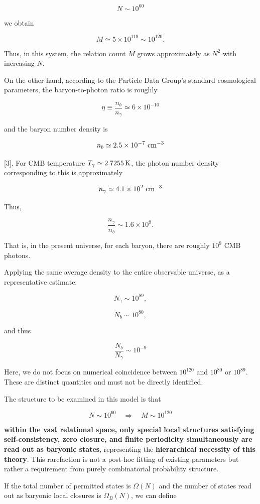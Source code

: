 \documentclass[
  a4paper,
]{article}
\begin{document}
\[
N\sim10^{60}
\]

we obtain

\[
M
\simeq
5\times10^{119}
\sim10^{120}.
\tag{20}
\]

Thus, in this system, the relation count \(M\) grows approximately as
\(N^2\) with increasing \(N\).

On the other hand, according to the Particle Data Group's standard
cosmological parameters, the baryon-to-photon ratio is roughly

\[
\eta
\equiv
\frac{n_b}{n_\gamma}
\simeq
6\times10^{-10}
\tag{21}
\]

and the baryon number density is

\[
n_b
\simeq
2.5\times10^{-7}\ {\rm cm}^{-3}
\]

{[}3{]}. For CMB temperature \(T_\gamma\simeq2.7255\,{\rm K}\), the
photon number density corresponding to this is approximately

\[
n_\gamma
\simeq
4.1\times10^2\ {\rm cm}^{-3}
\]

Thus,

\[
\frac{n_\gamma}{n_b}
\sim
1.6\times10^9.
\tag{22}
\]

That is, in the present universe, for each baryon, there are roughly
\(10^9\) CMB photons.

Applying the same average density to the entire observable universe, as
a representative estimate:

\[
N_\gamma\sim10^{89},
\]

\[
N_b\sim10^{80},
\]

and thus

\[
\frac{N_b}{N_\gamma}
\sim10^{-9}
\tag{23}
\]

Here, we do not focus on numerical coincidence between \(10^{120}\) and
\(10^{80}\) or \(10^{89}\). These are distinct quantities and must not
be directly identified.

The structure to be examined in this model is that

\[
N\sim10^{60}
\quad\Longrightarrow\quad
M\sim10^{120}
\]

\textbf{within the vast relational space, only special local structures
satisfying self-consistency, zero closure, and finite periodicity
simultaneously are read out as baryonic states}, representing the
\textbf{hierarchical necessity of this theory}. This rarefaction is not
a post-hoc fitting of existing parameters but rather a requirement from
purely combinatorial probability structure.

If the total number of permitted states is \(\Omega(N)\) and the number
of states read out as baryonic local closures is \(\Omega_B(N)\), we can
define
\end{document}
